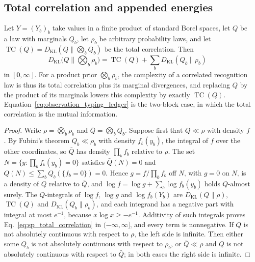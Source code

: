\subsection{Total correlation and appended energies}\label{app:sp_total_correlation}

\begin{proposition}\label{prop:sp_total_correlation}
Let $Y=(Y_b)_b$ take values in a finite product of standard Borel spaces, let $Q$ be a law with marginals $Q_b$, let $\rho_b$ be arbitrary probability laws, and let $\operatorname{TC}(Q)=D_{\mathrm{KL}}(Q\|\bigotimes_bQ_b)$ be the total correlation. Then
\begin{equation}
D_{\mathrm{KL}}\Big(Q\Big\|\bigotimes_b\rho_b\Big)=\operatorname{TC}(Q)+\sum_bD_{\mathrm{KL}}(Q_b\|\rho_b)
\label{eq:sp_total_correlation}
\end{equation}
in $[0,\infty]$. For a product prior $\bigotimes_b\rho_b$, the complexity of a correlated recognition law is thus its total correlation plus its marginal divergences, and replacing $Q$ by the product of its marginals lowers this complexity by exactly $\operatorname{TC}(Q)$. Equation~\eqref{eq:observation_typing_ledger} is the two-block case, in which the total correlation is the mutual information.
\end{proposition}
\begin{proof}
Write $\rho=\bigotimes_b\rho_b$ and $\bar Q=\bigotimes_bQ_b$. Suppose first that $Q\ll\rho$ with density $f$. By Fubini's theorem $Q_b\ll\rho_b$ with density $f_b(y_b)$, the integral of $f$ over the other coordinates, so $\bar Q$ has density $\prod_bf_b$ relative to $\rho$. The set $N=\{y:\prod_bf_b(y_b)=0\}$ satisfies $\bar Q(N)=0$ and $Q(N)\leq\sum_bQ_b(\{f_b=0\})=0$. Hence $g=f/\prod_bf_b$ off $N$, with $g=0$ on $N$, is a density of $Q$ relative to $\bar Q$, and $\log f=\log g+\sum_b\log f_b(y_b)$ holds $Q$-almost surely. The $Q$-integrals of $\log f$, $\log g$ and $\log f_b(Y_b)$ are $D_{\mathrm{KL}}(Q\|\rho)$, $\operatorname{TC}(Q)$ and $D_{\mathrm{KL}}(Q_b\|\rho_b)$, and each integrand has a negative part with integral at most $e^{-1}$, because $x\log x\geq-e^{-1}$. Additivity of such integrals proves Eq.~\eqref{eq:sp_total_correlation} in $(-\infty,\infty]$, and every term is nonnegative. If $Q$ is not absolutely continuous with respect to $\rho$, the left side is infinite. Then either some $Q_b$ is not absolutely continuous with respect to $\rho_b$, or $\bar Q\ll\rho$ and $Q$ is not absolutely continuous with respect to $\bar Q$; in both cases the right side is infinite.
\end{proof}

